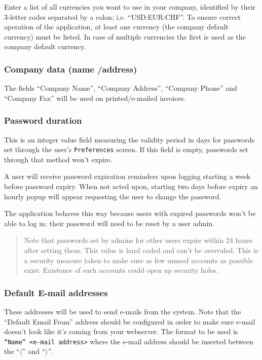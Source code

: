 Enter a list of all currencies you want
to use in your company, identified by their 3-letter codes separated by a colon; i.e.
``USD:EUR:CHF''. To ensure correct operation of the application, at least one currency
(the company default currency) must be listed. In case of multiple currencies the first
is used as the company default currency.

\subsubsection{Company data (name /address)}
\label{subsubsec-company-config-defaults-name-address}

The fields ``Company Name'', ``Company Address'',
``Company Phone'' and ``Company Fax'' will be used on printed/e-mailed invoices.

\subsubsection{Password duration}
\label{subsubsec-company-config-defaults-password-duration}

This is an integer value field measuring the validity period in days for passwords set through
the user's \texttt{Preferences} screen. If this field is empty, passwords set through that method
won't expire.

A user will receive password expiration reminders upon logging starting a week before password
expiry. When not acted upon, starting two days before expiry an hourly popup will appear
requesting the user to change the password.

The application behaves this way because users with expired passwords won't be able to log in:
their password will need to be reset by a user admin.

\begin{quotation}
Note that passwords set by admins for other users expire within 24 hours after setting them.
This value is hard coded and can't be overruled. This is a security measure taken to make
sure as few unused accounts as possible exist: Existence of such accounts could open up security
holes.
\end{quotation}


\subsubsection{Default E-mail addresses}
\label{subsubsec-company-config-defaults-email}

These addresses will be used to send e-mails from the system.
Note that the ``Default Email From'' address should be configured in order to make sure
e-mail doesn't look like it's coming from your webserver. The format to be used is \texttt{``Name'' <e-mail address>} where the e-mail address should be inserted between the
``$\langle$'' and ``$\rangle$''.

